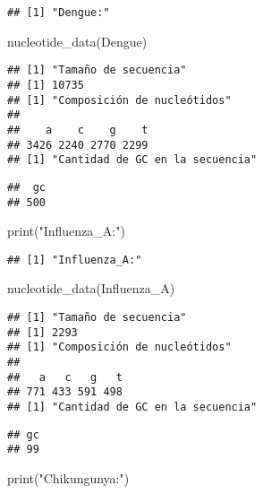 \documentclass[
]{article}
\newenvironment{Shaded}{\begin{snugshade}}{\end{snugshade}}
\newcommand{\FunctionTok}[1]{\textcolor[rgb]{0.00,0.00,0.00}{#1}}
\newcommand{\NormalTok}[1]{#1}
\newcommand{\StringTok}[1]{\textcolor[rgb]{0.31,0.60,0.02}{#1}}
\begin{document}
\begin{verbatim}
## [1] "Dengue:"
\end{verbatim}

\begin{Shaded}
\begin{Highlighting}[]
\FunctionTok{nucleotide\_data}\NormalTok{(Dengue)}
\end{Highlighting}
\end{Shaded}

\begin{verbatim}
## [1] "Tamaño de secuencia"
## [1] 10735
## [1] "Composición de nucleótidos"
## 
##    a    c    g    t 
## 3426 2240 2770 2299 
## [1] "Cantidad de GC en la secuencia"
\end{verbatim}

\begin{verbatim}
##  gc 
## 500
\end{verbatim}

\begin{Shaded}
\begin{Highlighting}[]
\FunctionTok{print}\NormalTok{(}\StringTok{"Influenza\_A:"}\NormalTok{)}
\end{Highlighting}
\end{Shaded}

\begin{verbatim}
## [1] "Influenza_A:"
\end{verbatim}

\begin{Shaded}
\begin{Highlighting}[]
\FunctionTok{nucleotide\_data}\NormalTok{(Influenza\_A)}
\end{Highlighting}
\end{Shaded}

\begin{verbatim}
## [1] "Tamaño de secuencia"
## [1] 2293
## [1] "Composición de nucleótidos"
## 
##   a   c   g   t 
## 771 433 591 498 
## [1] "Cantidad de GC en la secuencia"
\end{verbatim}

\begin{verbatim}
## gc 
## 99
\end{verbatim}

\begin{Shaded}
\begin{Highlighting}[]
\FunctionTok{print}\NormalTok{(}\StringTok{"Chikungunya:"}\NormalTok{)}
\end{Highlighting}
\end{Shaded}
\end{document}
